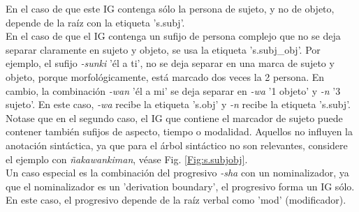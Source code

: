 \documentclass[a4paper,11pt,DIV12]{scrartcl}
\begin{document}
En el caso de que este IG contenga s\'olo la persona de sujeto, y no de objeto, depende de la ra\'iz con la etiqueta 's.subj'.\\
En el caso de que el IG contenga un sufijo de persona complejo que no se deja separar claramente en sujeto y objeto, se usa la etiqueta 's.subj\_obj'. Por ejemplo, el sufijo {\em -sunki} '\'el a ti', no se deja separar en una marca de sujeto y objeto, porque morfol\'ogicamente, est\'a marcado dos veces la 2{\textordfeminine} persona. En cambio, la combinaci\'on {\em -wan} '\'el a mi' se deja separar en {\em -wa} '1{\textordfeminine} objeto' y {\em -n} '3{\textordfeminine} sujeto'. En este caso, {\em -wa} recibe la etiqueta 's.obj' y {\em -n} recibe la etiqueta 's.subj'.\\
Notase que en el segundo caso, el IG que contiene el marcador de sujeto puede contener tambi\'en sufijos de aspecto, tiempo o modalidad. Aquellos no influyen la anotaci\'on sint\'actica, ya que para el \'arbol sint\'actico no son relevantes, considere el ejemplo con {\em \~nakawankiman}, v\'ease Fig. \ref{Fig:s.subjobj}.\\
Un caso especial es la combinaci\'on del progresivo {\em -sha} con un nominalizador, ya que el nominalizador es un 'derivation boundary', el progresivo forma un IG s\'olo. En este caso, el progresivo depende de la ra\'iz verbal como 'mod' (modificador).
\end{document}
